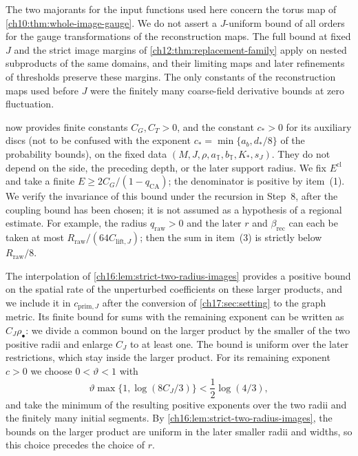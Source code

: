 The two majorants for the input functions used here concern the torus map of \cref{ch10:thm:whole-image-gauge}. We do not assert a $J$-uniform bound of all orders for the gauge transformations of the reconstruction maps. The full bound at fixed $J$ and the strict image margins of \cref{ch12:thm:replacement-family} apply on nested subproducts of the same domains, and their limiting maps and later refinements of thresholds preserve these margins. The only constants of the reconstruction maps used before $J$ were the finitely many coarse-field derivative bounds at zero fluctuation.

 now provides finite constants $C_G,C_T>0$, and the constant $c_*>0$ for its auxiliary discs (not to be confused with the exponent $c_*=\min\{a_b,d_*/8\}$ of the probability bounds), on the fixed data $(M,J,\rho,a_{\mathbb T},b_{\mathbb T},K_*,s_J)$. They do not depend on the side, the preceding depth, or the later support radius. We fix $E^{\mathrm{cl}}$ and take a finite $E\ge2C_G/(1-q_{\mathrm{CA}})$; the denominator is positive by item~(1). We verify the invariance of this bound under the recursion in Step~8, after the coupling bound has been chosen; it is not assumed as a hypothesis of a regional estimate. For example, the radius $q_{\mathrm{raw}}>0$ and the later $r$ and $\beta_{\mathrm{rec}}$ can each be taken at most $R_{\mathrm{raw}}/(64C_{\mathrm{lift},J})$; then the sum in item~(3) is strictly below $R_{\mathrm{raw}}/8$.

The interpolation of \cref{ch16:lem:strict-two-radius-images} provides a positive bound on the spatial rate of the unperturbed coefficients on these larger products, and we include it in $c_{\mathrm{prim},J}$ after the conversion of \cref{ch17:sec:setting} to the graph metric. Its finite bound for sums with the remaining exponent can be written as $C_J\rho_\bullet$: we divide a common bound on the larger product by the smaller of the two positive radii and enlarge $C_J$ to at least one. The bound is uniform over the later restrictions, which stay inside the larger product. For its remaining exponent $c>0$ we choose $0<\vartheta<1$ with
\begin{equation}\label{ch20:eq:interpolation-choice}
 \vartheta\max\{1,\log(8C_J/3)\}<\frac12\log(4/3),
\end{equation}
and take the minimum of the resulting positive exponents over the two radii and the finitely many initial segments. By \cref{ch16:lem:strict-two-radius-images}, the bounds on the larger product are uniform in the later smaller radii and widths, so this choice precedes the choice of $r$.

